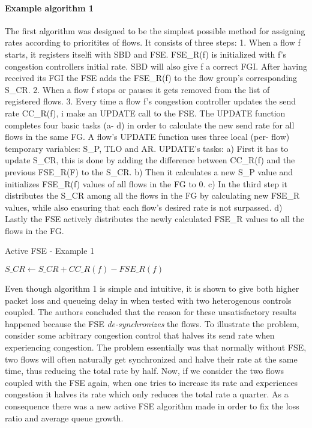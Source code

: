 \documentclass[UKenglish]{ifimaster}
\begin{document}
\paragraph{Example algorithm 1}
The first algorithm was designed to be the simplest possible method for assigning rates according to prioritites of flows. 
It consists of three steps:
1. When a flow f starts, it registers itselfi with SBD and FSE. FSE\_R(f) is initialized with f's congestion controllers initial rate. 
SBD will also give f a correct FGI.
After having received its FGI the FSE adds the FSE\_R(f) to the flow group's corresponding S\_CR.
2. When a flow f stops or pauses it gets removed from the list of registered flows.
3. Every time a flow f's congestion controller updates the send rate CC\_R(f), i make an UPDATE call to the FSE.
The UPDATE function completes four basic tasks (a- d) in order to calculate the new send rate for all flows in the same FG.
A flow's UPDATE function uses three local (per- flow) temporary variables: S\_P, TLO and AR.
UPDATE's tasks:
a) First it has to update S\_CR, this is done by adding the difference between CC\_R(f) and the previous FSE\_R(F) to the S\_CR.
b) Then it calculates a new S\_P value and initializes FSE\_R(f) values of all flows in the FG to 0.
c) In the third step it distributes the S\_CR among all the flows in the FG by calculating new FSE\_R values, while also ensuring that each flow's desired rate is not surpassed.
d) Lastly the FSE actively distributes the newly calculated FSE\_R values to all the flows in the FG.

\begin{algorithm}
    \caption{Active FSE - Example 1}
    \begin{algorithmic}
        \STATE $S\_CR \leftarrow S\_CR + CC\_R(f) - FSE\_R(f)$ 
    \end{algorithmic}
\end{algorithm}


Even though algorithm 1 is simple and intuitive, it is shown to give both higher packet loss and queueing delay in \cite{10.1145/2740070.2630089} when tested with two heterogenous controls coupled. 
The authors concluded that the reason for these unsatisfactory results happened because the FSE \textit{de-synchronizes} the flows.
To illustrate the problem, consider some arbitrary congestion control that halves its send rate when experiencing congestion.
The problem essentially was that normally without FSE, two flows will often naturally get synchronized and halve their rate at the same time, thus reducing the total rate by half.
Now, if we consider the two flows coupled with the FSE again, when one tries to increase its rate and experiences congestion it halves its rate which only reduces the total rate a quarter.
As a consequence there was a new active FSE algorithm made in order to fix the loss ratio and average queue growth.
\end{document}
